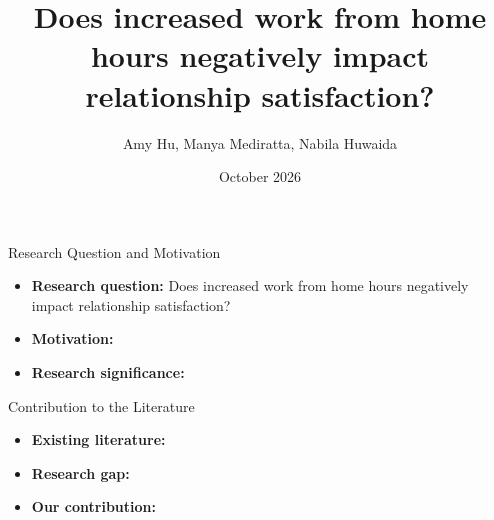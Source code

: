 \documentclass[aspectratio=169,11pt]{beamer}
\title{Does increased work from home hours negatively impact relationship satisfaction?}
\author{Amy Hu, Manya Mediratta, Nabila Huwaida}
\date{October 2026}
\begin{document}

\begin{frame}
    \titlepage
\end{frame}


\begin{frame}{Research Question and Motivation}

    \begin{itemize}
        \item \textbf{Research question:}
        Does increased work from home hours negatively
        impact relationship satisfaction?

        \vspace{0.4cm}

        \item \textbf{Motivation:}

        \item \textbf{Research significance:}

    \end{itemize}

\end{frame}


\begin{frame}{Contribution to the Literature}

    \begin{itemize}
        \item \textbf{Existing literature:}

        \item \textbf{Research gap:}

        \item \textbf{Our contribution:}

    \end{itemize}

\end{frame}
\end{document}
